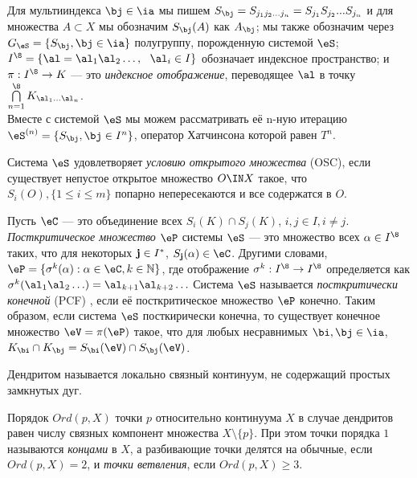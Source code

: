 Для мультииндекса $\bj\in\ia$ мы пишем $S_\bj=S_{j_1j_2...j_n}=S_{j_1}S_{j_2}...S_{j_n}$ и для множества $A \subset X$ мы обозначим $S_\bj(A)$ как $A_\bj$; мы также обозначим через $G_\eS=\{S_\bj, \bj\in\ia\}$ полугруппу, порожденную системой $\eS$;\\
$I^{\8}=\{{\bf \al}=\al_1\al_2\ldots,\ \ \al_i\in I\}$ обозначает индексное пространство; и $\pi:I^{\8}\rightarrow K$ --- это {\em индексное отображение}, переводящее $\bf\al$ в точку $\bigcap\limits_{n=1}^\8 K_{\al_1\ldots\al_n}$.\\
Вместе с системой $\eS$ мы можем рассматривать её n-ную итерацию $\eS^{(n)}=\{S_\bj, \bj\in I^n\}$, оператор Хатчинсона которой равен $T^n$.

\begin{definition}
Система ${\eS}$ удовлетворяет {\em условию открытого множества} (OSC), если существует непустое открытое множество $O \IN X$ такое, что $S_i (O), \{1 \le i\le m\}$ попарно непересекаются и все содержатся в $O$.
\end{definition}

Пусть $\eC$ --- это объединение всех  $S_i(K)\cap S_j(K)$, $i,j \in I, i\neq j$.
{\em Посткритическое множество} $\eP$ системы $\eS$ --- это множество всех $\alpha\in I^{\8}$ таких, что для некоторых ${\bf j}\in I^*$, $S_ {\bf j}(\alpha)\in\eC$. 
Другими словами, $\eP= \lbrace \sigma^k(\alpha) : \alpha\in \eC,k\in \mathbb{N}\rbrace$, где отображение $\sigma^k:I^{\8}\to I^{\8}$ определяется как $\sigma^k(\al_1\al_2\ldots)=\al_{k+1}\al_{k+2}\ldots$
Система $\eS$ называется {\em посткритически конечной} (PCF) \cite{Kig}, если её посткритическое множество $\eP$ конечно. 
Таким образом, если система  $\eS$ посткирически конечна, то существует конечное множество $\eV=\pi(\eP)$ такое, что для любых несравнимых $\bi,\bj\in\ia$,  $K_\bi\cap K_\bj= S_\bi(\eV)\cap S_\bj(\eV)$.

\begin{definition}
Дендритом называется локально связный континуум, не содержащий простых замкнутых дуг.
\end{definition}

Порядок $Ord(p,X)$ точки $p$  относительно континуума $X$  в случае дендритов равен   числу связных компонент  множества $X \setminus \{p\}$. При этом точки порядка $1$ называются {\em концами} в $X$, а разбивающие точки делятся на обычные, если $Ord(p,X)=2$, и  {\em точки ветвления}, если $Ord(p,X)\ge3$.\\

